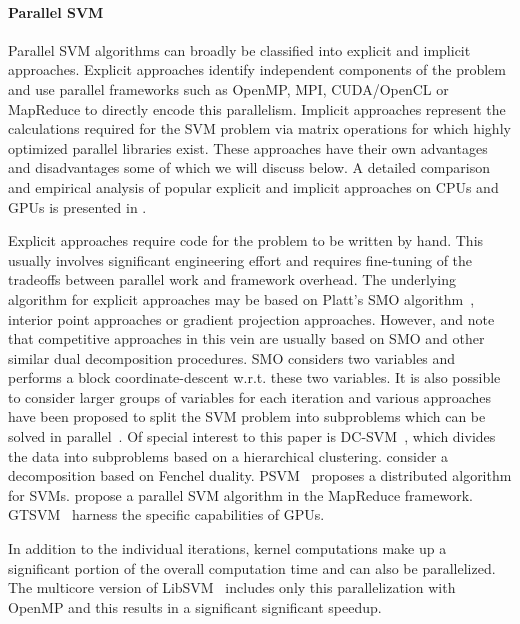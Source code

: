 \paragraph{Parallel SVM}
Parallel SVM algorithms can broadly be classified into explicit and implicit approaches. Explicit approaches identify  independent components of the problem and use parallel frameworks such as OpenMP, MPI, CUDA/OpenCL or MapReduce to directly encode this parallelism. Implicit approaches represent the calculations required for the SVM problem via matrix operations for which highly optimized parallel libraries exist. These approaches have their own advantages and disadvantages some of which we will discuss below. A detailed comparison and empirical analysis of popular explicit and implicit approaches on CPUs and GPUs is presented in \cite{tyree2014parallel}.

Explicit approaches require code for the problem to be written by hand. This usually involves significant engineering effort and requires fine-tuning of the tradeoffs between parallel work and framework overhead. The underlying algorithm for explicit approaches may be based on Platt's SMO algorithm~\citep{platt1999fast}, interior point approaches or gradient projection approaches. However, \cite{brugger2006parallel} and \cite{tyree2014parallel} note that competitive approaches in this vein are usually based on SMO and other similar dual decomposition procedures. SMO considers two variables and performs a block coordinate-descent w.r.t. these two variables. It is also possible to consider larger groups of variables for each iteration and various approaches have been proposed to split the SVM problem into subproblems which can be solved in parallel~\citep{cao2006parallel, collobert2002parallel, graf2004parallel, zhang2005parallel}. Of special interest to this paper is DC-SVM~\citep{hsieh2013divide}, which divides the data into subproblems based on a hierarchical clustering. \cite{hazan2008parallel} consider a decomposition based on Fenchel duality.  PSVM~\citep{zhu2008parallelizing} proposes a distributed algorithm for SVMs. \cite{zhao2011parallel} propose a parallel SVM algorithm in the MapReduce framework. GTSVM~\citep{cotter2011gpu} harness the specific capabilities of GPUs. 

In addition to the individual iterations, kernel computations make up a significant portion of the overall computation time and can also be parallelized. The multicore version of LibSVM~\citep{chang2011libsvm} includes only this parallelization with OpenMP and this results in a significant significant speedup.

